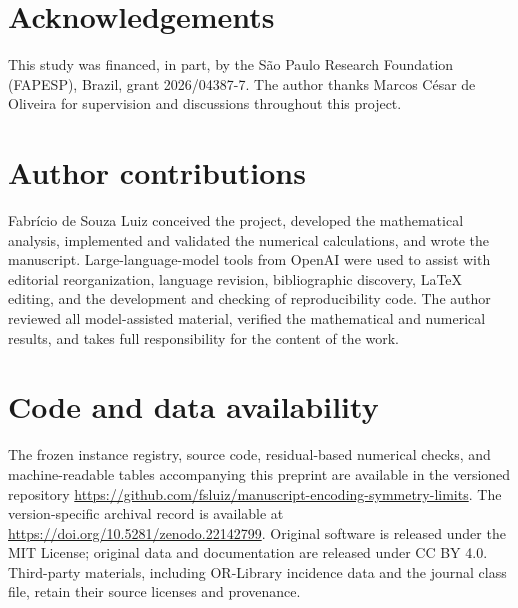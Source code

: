 \documentclass[twocolumn,superscriptaddress,a4paper,nopdfoutputerror]{quantumarticle}
\begin{document}
\section*{Acknowledgements}
This study was financed, in part, by the São Paulo Research Foundation
(FAPESP), Brazil, grant 2026/04387-7.  The author thanks Marcos César de
Oliveira for supervision and discussions throughout this project.

\section*{Author contributions}
Fabrício de Souza Luiz conceived the project, developed the mathematical
analysis, implemented and validated the numerical calculations, and wrote
the manuscript.  Large-language-model tools from OpenAI were used to assist
with editorial reorganization, language revision, bibliographic discovery,
LaTeX editing, and the development and checking of reproducibility code.
The author reviewed all model-assisted material, verified the mathematical
and numerical results, and takes full responsibility for the content of the
work.

\section*{Code and data availability}
The frozen instance registry, source code, residual-based numerical checks,
and machine-readable tables accompanying this preprint are available in the
versioned repository
\url{https://github.com/fsluiz/manuscript-encoding-symmetry-limits}.
The version-specific archival record is available at
\url{https://doi.org/10.5281/zenodo.22142799}.
Original software is released under the MIT License; original data and
documentation are released under CC BY 4.0.  Third-party materials, including
OR-Library incidence data and the journal class file, retain their source
licenses and provenance.




\appendix






\end{document}
